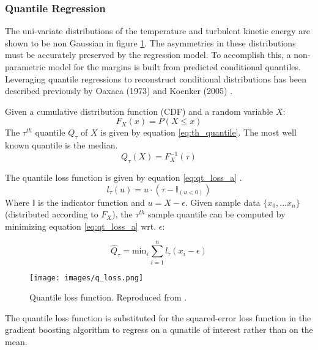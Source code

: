 \subsubsection{Quantile Regression}

The uni-variate distributions of the temperature and turbulent kinetic energy are shown to be non Gaussian in figure \ref{fig:ctf_patch_dist}.  The asymmetries in these distributions must be accurately preserved by the regression model.  To accomplish this, a non-parametric model for the margins is built from predicted conditional quantiles.  Leveraging quantile regressions to reconstruct conditional distributions has been described previously by Oaxaca (1973) and Koenker (2005) \cite{koenker05}.

Given a cumulative distribution function (CDF) and a random variable $X$:
\begin{equation}
F_X(x) = P(X \leq x)
\end{equation}
The $\tau^{th}$ quantile $Q_\tau$ of $X$ is given by equation \ref{eq:th_quantile}.  The most well known quantile is the median.
\begin{equation}
Q_\tau(X) = F_X^{-1}(\tau)
\label{eq:th_quantile}
\end{equation}

The quantile loss function is given by equation \ref{eq:qt_loss_a} \cite{koenker05}.
\begin{equation}
l_\tau(u) = u \cdot (\tau - \mathbb{I}_{(u < 0)})
\label{eq:qt_loss_a}
\end{equation}
Where $\mathbb{I}$ is the indicator function and $u=X - \epsilon$.
Given sample data $\{x_0, ... x_n\}$ (distributed according to $F_X$), the $\tau^{th}$ sample quantile can be computed by minimizing equation \ref{eq:qt_loss_a} wrt. $\epsilon$:

\begin{equation}
\hat Q_\tau = \mathrm{min}_\epsilon \sum_{i=1}^n l_\tau (x_i - \epsilon)
\end{equation}

\begin{figure}[!htbp]
\centering
\texttt{[image: images/q\_loss.png]}
\caption{Quantile loss function.  Reproduced from \cite{koenker05}.}
\label{fig:ctf_patch_dist}
\end{figure}

The quantile loss function is substituted for the squared-error loss function in the gradient boosting algorithm to regress on a qunatile of interest rather than on the mean.  

